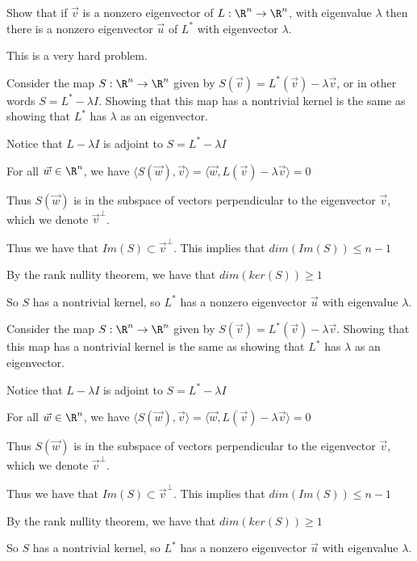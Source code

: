 \documentclass{ximera}
\begin{document}
		
			Show that if $\vec{v}$ is a nonzero eigenvector of $L:\R^n \to \R^n$, with eigenvalue $\lambda$ then
			there is a nonzero eigenvector $\vec{u}$ of $L^*$ with eigenvector $\lambda$. 
\begin{warning}
	This is a very hard problem.
\end{warning}
\begin{hint}
	Consider the map $S: \R^n \to \R^n$ given by $S(\vec{v}) = L^*(\vec{v}) - \lambda \vec{v}$, or in other words $S = L^* - \lambda I$.  Showing that this map has a nontrivial kernel is the same as
	showing that $L^*$ has $\lambda$ as an eigenvector.
\end{hint}
\begin{hint}
	Notice that $L-\lambda I$ is adjoint to $S = L^* -\lambda I$
\end{hint}
\begin{hint}
	For all $\vec{w} \in \R^n$, we have $\langle S(\vec{w}),\vec{v}\rangle = \langle \vec{w}, L(\vec{v}) - \lambda \vec{v}\rangle = 0$
\end{hint}
\begin{hint}
	Thus $S(\vec{w})$ is in the subspace of vectors perpendicular to the eigenvector $\vec{v}$, which we denote $\vec{v}^\perp$.
\end{hint}
\begin{hint}
	Thus we have that $Im(S) \subset \vec{v}^\perp$.  This implies that $dim(Im(S)) \leq n-1$
\end{hint}
\begin{hint}
	By the rank nullity theorem, we have that $dim(ker(S)) \geq 1$
\end{hint}
\begin{hint}
	So $S$ has a nontrivial kernel, so $L^*$ has a nonzero eigenvector $\vec{u}$ with eigenvalue $\lambda$. 
\end{hint}
\begin{free-response}
	Consider the map $S: \R^n \to \R^n$ given by $S(\vec{v}) = L^*(\vec{v}) - \lambda \vec{v}$.  Showing that this map has a nontrivial kernel is the same as
	showing that $L^*$ has $\lambda$ as an eigenvector.
	
	Notice that $L-\lambda I$ is adjoint to $S = L^* -\lambda I$
	
	For all $\vec{w} \in \R^n$, we have $\langle S(\vec{w}),\vec{v}\rangle = \langle \vec{w}, L(\vec{v}) - \lambda \vec{v}\rangle = 0$
	
	Thus $S(\vec{w})$ is in the subspace of vectors perpendicular to the eigenvector $\vec{v}$, which we denote $\vec{v}^\perp$.
	
	Thus we have that $Im(S) \subset \vec{v}^\perp$.  This implies that $dim(Im(S)) \leq n-1$
	
	By the rank nullity theorem, we have that $dim(ker(S)) \geq 1$
	
	So $S$ has a nontrivial kernel, so $L^*$ has a nonzero eigenvector $\vec{u}$ with eigenvalue $\lambda$. 
\end{free-response}
		
		
	
\end{document}
